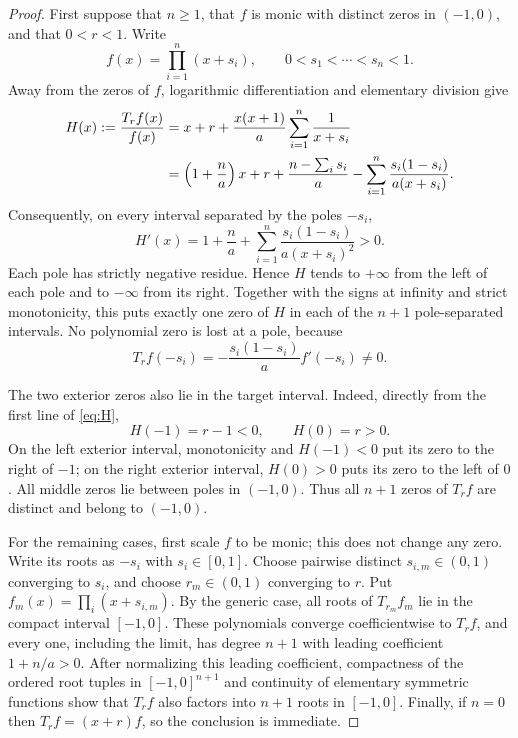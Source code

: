\documentclass[11pt]{article}
\begin{document}
\begin{proof}
First suppose that $n\geq1$, that $f$ is monic with distinct zeros in
$(-1,0)$, and that $0<r<1$.  Write
\[
 f(x)=\prod_{i=1}^n(x+s_i),\qquad 0<s_1<\cdots<s_n<1.
\]
Away from the zeros of $f$, logarithmic differentiation and elementary
division give
\begin{align}
 H(x):=\frac{T_rf(x)}{f(x)}
 &=x+r+\frac{x(x+1)}a\sum_{i=1}^n\frac1{x+s_i}\notag\\
 &=\left(1+\frac na\right)x+r+\frac{n-\sum_i s_i}{a}
   -\sum_{i=1}^n\frac{s_i(1-s_i)}{a(x+s_i)}.\label{eq:H}
\end{align}
Consequently, on every interval separated by the poles $-s_i$,
\begin{equation}\label{eq:Hprime}
 H'(x)=1+\frac na+
 \sum_{i=1}^n\frac{s_i(1-s_i)}{a(x+s_i)^2}>0.
\end{equation}
Each pole has strictly negative residue.  Hence $H$ tends to $+\infty$
from the left of each pole and to $-\infty$ from its right.  Together with
the signs at infinity and strict monotonicity, this puts exactly one zero of
$H$ in each of the $n+1$ pole-separated intervals.  No polynomial zero is
lost at a pole, because
\[
 T_rf(-s_i)=-\frac{s_i(1-s_i)}a f'(-s_i)\neq0.
\]

The two exterior zeros also lie in the target interval.  Indeed, directly
from the first line of \eqref{eq:H},
\begin{equation}\label{eq:endpoint-values}
 H(-1)=r-1<0,\qquad H(0)=r>0.
\end{equation}
On the left exterior interval, monotonicity and $H(-1)<0$ put its zero to
the right of $-1$; on the right exterior interval, $H(0)>0$ puts its zero
to the left of $0$.  All middle zeros lie between poles in $(-1,0)$.
Thus all $n+1$ zeros of $T_rf$ are distinct and belong to $(-1,0)$.

For the remaining cases, first scale $f$ to be monic; this does not change
any zero.  Write its roots as $-s_i$ with $s_i\in[0,1]$.  Choose pairwise
distinct $s_{i,m}\in(0,1)$ converging to $s_i$, and choose
$r_m\in(0,1)$ converging to $r$.  Put
$f_m(x)=\prod_i(x+s_{i,m})$.  By the generic case, all roots of
$T_{r_m}f_m$ lie in the compact interval $[-1,0]$.  These polynomials
converge coefficientwise to $T_rf$, and every one, including the limit, has
degree $n+1$ with leading coefficient $1+n/a>0$.  After normalizing this
leading coefficient, compactness of the ordered root tuples in
$[-1,0]^{n+1}$ and continuity of elementary symmetric functions show that
$T_rf$ also factors into $n+1$ roots in $[-1,0]$.  Finally, if $n=0$ then
$T_rf=(x+r)f$, so the conclusion is immediate.
\end{proof}
\end{document}
